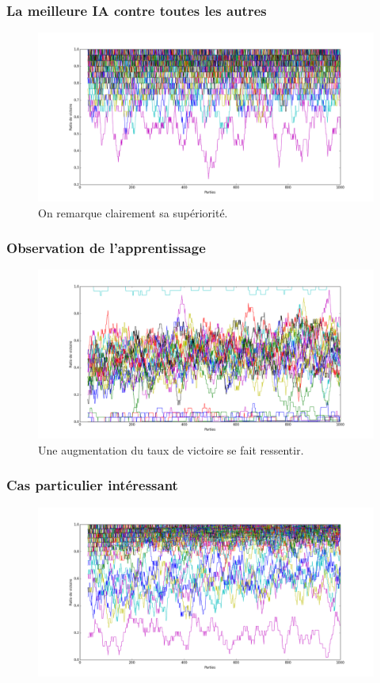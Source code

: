 \documentclass{beamer}
\begin{document}
\begin{frame}
  \frametitle{La meilleure IA contre toutes les autres}
  \begin{figure}
    \includegraphics[scale=0.265]{plot/best.png}
    \caption{
      \label{fig_best} On remarque clairement sa supériorité.
    }
  \end{figure}
\end{frame}

\begin{frame}
  \frametitle{Observation de l'apprentissage}
  \begin{figure}
    \includegraphics[scale=0.265]{plot/eleve2.png}
    \caption{
      \label{fig_eleve2} Une augmentation du taux de victoire se fait ressentir.
    }
  \end{figure}
\end{frame}

\begin{frame}
  \frametitle{Cas particulier intéressant}
  \begin{figure}
    \includegraphics[scale=0.265]{plot/fake.png}
  \end{figure}
\end{frame}
\end{document}

